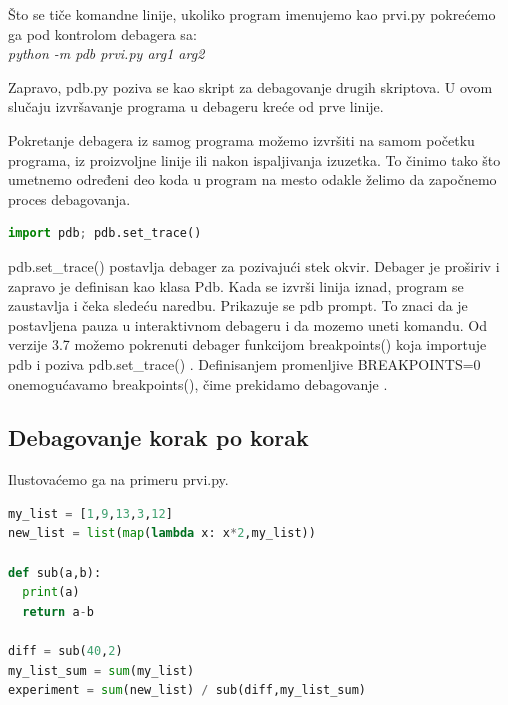 \documentclass[a4paper]{article}
\begin{document}
Što se tiče komandne linije, ukoliko program imenujemo kao prvi.py pokrećemo ga pod kontrolom debagera sa:
\\\emph{python -m pdb prvi.py arg1 arg2}

Zapravo, pdb.py poziva se kao skript za debagovanje drugih skriptova. U ovom slučaju izvršavanje programa u debageru kreće od prve linije.

Pokretanje debagera iz samog programa možemo izvršiti na samom početku programa, iz proizvoljne linije ili nakon ispaljivanja izuzetka. To činimo tako što umetnemo određeni deo koda u program na mesto odakle želimo da započnemo proces debagovanja.
\begin{lstlisting}[language = python, caption = {Započinjemo debagovanje}]
import pdb; pdb.set_trace()
\end{lstlisting}

pdb.set\_trace() postavlja debager za pozivajući stek okvir. Debager je proširiv i zapravo je definisan kao klasa Pdb. Kada se izvrši linija iznad, program se zaustavlja i čeka sledeću naredbu. Prikazuje se pdb prompt. To znaci da je postavljena pauza u interaktivnom debageru i da mozemo uneti komandu.
Od verzije 3.7 možemo pokrenuti debager funkcijom breakpoints() koja importuje pdb i poziva pdb.set\_trace() \cite{pdbExamples}. Definisanjem promenljive BREAKPOINTS=0 onemogućavamo breakpoints(), čime prekidamo debagovanje \cite{pdbExamples}.
\subsection{Debagovanje korak po korak}
Ilustovaćemo ga na primeru prvi.py.
\begin{lstlisting}[language = python, caption = {Primer za ilustrovanje narednih komandi (prvi.py)}]
my_list = [1,9,13,3,12]
new_list = list(map(lambda x: x*2,my_list))

def sub(a,b):
  print(a)
  return a-b
  
diff = sub(40,2)
my_list_sum = sum(my_list)
experiment = sum(new_list) / sub(diff,my_list_sum)
\end{lstlisting}
\end{document}
